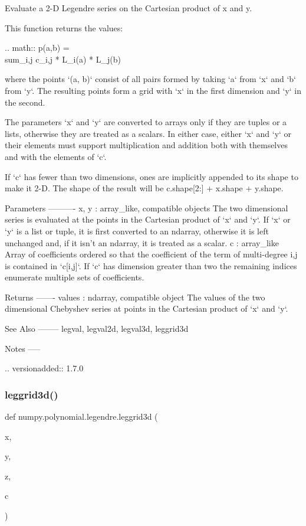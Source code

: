 \begin{DoxyVerb}Evaluate a 2-D Legendre series on the Cartesian product of x and y.

This function returns the values:

.. math:: p(a,b) = \\sum_{i,j} c_{i,j} * L_i(a) * L_j(b)

where the points `(a, b)` consist of all pairs formed by taking
`a` from `x` and `b` from `y`. The resulting points form a grid with
`x` in the first dimension and `y` in the second.

The parameters `x` and `y` are converted to arrays only if they are
tuples or a lists, otherwise they are treated as a scalars. In either
case, either `x` and `y` or their elements must support multiplication
and addition both with themselves and with the elements of `c`.

If `c` has fewer than two dimensions, ones are implicitly appended to
its shape to make it 2-D. The shape of the result will be c.shape[2:] +
x.shape + y.shape.

Parameters
----------
x, y : array_like, compatible objects
    The two dimensional series is evaluated at the points in the
    Cartesian product of `x` and `y`.  If `x` or `y` is a list or
    tuple, it is first converted to an ndarray, otherwise it is left
    unchanged and, if it isn't an ndarray, it is treated as a scalar.
c : array_like
    Array of coefficients ordered so that the coefficient of the term of
    multi-degree i,j is contained in `c[i,j]`. If `c` has dimension
    greater than two the remaining indices enumerate multiple sets of
    coefficients.

Returns
-------
values : ndarray, compatible object
    The values of the two dimensional Chebyshev series at points in the
    Cartesian product of `x` and `y`.

See Also
--------
legval, legval2d, legval3d, leggrid3d

Notes
-----

.. versionadded:: 1.7.0\end{DoxyVerb}
 \mbox{\label{namespacenumpy_1_1polynomial_1_1legendre_a2edd517d2e8dfb756db31cf9d4c23e3d}} 
\subsubsection{\texorpdfstring{leggrid3d()}{leggrid3d()}}
{\footnotesize\ttfamily def numpy.\+polynomial.\+legendre.\+leggrid3d (\begin{DoxyParamCaption}\item[{}]{x,  }\item[{}]{y,  }\item[{}]{z,  }\item[{}]{c }\end{DoxyParamCaption})}

